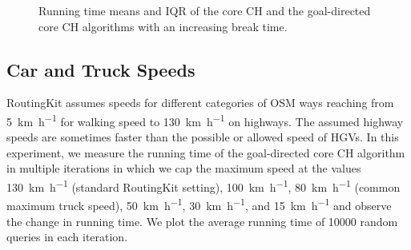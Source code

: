 \begin{figure}[hbtp]
	\centering
	\hfill
	\caption{Running time means and IQR of the core CH and the goal-directed core CH algorithms with an increasing break time.}
	\label{fig:eval_break_time}
\end{figure}


\subsection{Car and Truck Speeds}
RoutingKit assumes speeds for different categories of OSM ways reaching from \SI[per-mode = symbol]{5}{\kilo\meter\per\hour} for walking speed to \SI[per-mode = symbol]{130}{\kilo\meter\per\hour} on highways. The assumed highway speeds are sometimes faster than the possible or allowed speed of HGVs. In this experiment, we measure the running time of the goal-directed core CH algorithm in multiple iterations in which we cap the maximum speed at the values \SI[per-mode = symbol]{130}{\kilo\meter\per\hour} (standard RoutingKit setting), \SI[per-mode = symbol]{100}{\kilo\meter\per\hour}, \SI[per-mode = symbol]{80}{\kilo\meter\per\hour} (common maximum truck speed), \SI[per-mode = symbol]{50}{\kilo\meter\per\hour}, \SI[per-mode = symbol]{30}{\kilo\meter\per\hour}, and \SI[per-mode = symbol]{15}{\kilo\meter\per\hour} and observe the change in running time. We plot the average running time of \num{10000} random queries in each iteration.

